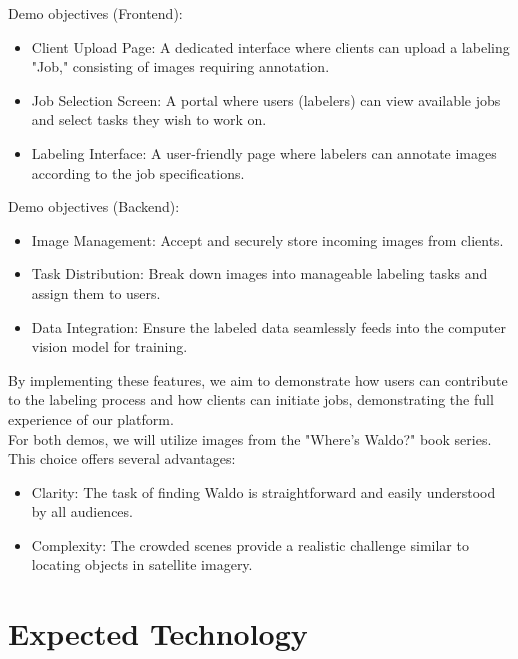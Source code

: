\documentclass{article}
\begin{document}
Demo objectives (Frontend):

\begin{itemize}
    \item Client Upload Page: A dedicated interface where clients can upload a labeling "Job," consisting of images requiring annotation.
    \item Job Selection Screen: A portal where users (labelers) can view available jobs and select tasks they wish to work on.
    \item Labeling Interface: A user-friendly page where labelers can annotate images according to the job specifications.
\end{itemize}

Demo objectives (Backend):

\begin{itemize}
    \item Image Management: Accept and securely store incoming images from clients.
    \item Task Distribution: Break down images into manageable labeling tasks and assign them to users.
    \item Data Integration: Ensure the labeled data seamlessly feeds into the computer vision model for training.
\end{itemize}

By implementing these features, we aim to demonstrate how users can contribute to the labeling process and how clients can initiate jobs, demonstrating the full experience of our platform.\\

For both demos, we will utilize images from the "Where's Waldo?" book series. This choice offers several advantages:

\begin{itemize}
    \item Clarity: The task of finding Waldo is straightforward and easily understood by all audiences.
    \item Complexity: The crowded scenes provide a realistic challenge similar to locating objects in satellite imagery.
\end{itemize}

\section{Expected Technology}

\end{document}
